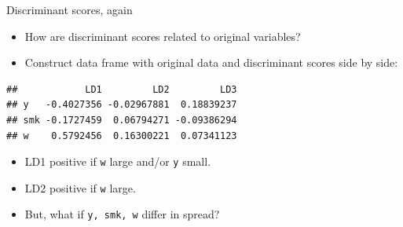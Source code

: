 \documentclass[ignorenonframetext,]{beamer}
\newenvironment{Shaded}{\begin{snugshade}}{\end{snugshade}}
\newcommand{\DecValTok}[1]{\textcolor[rgb]{0.00,0.00,0.81}{#1}}
\newcommand{\FloatTok}[1]{\textcolor[rgb]{0.00,0.00,0.81}{#1}}
\newcommand{\KeywordTok}[1]{\textcolor[rgb]{0.13,0.29,0.53}{\textbf{#1}}}
\newcommand{\NormalTok}[1]{#1}
\newcommand{\OperatorTok}[1]{\textcolor[rgb]{0.81,0.36,0.00}{\textbf{#1}}}
\newcommand{\StringTok}[1]{\textcolor[rgb]{0.31,0.60,0.02}{#1}}
\begin{document}
\begin{frame}[fragile]{Discriminant scores, again}
\protect\hypertarget{discriminant-scores-again}{}

\begin{itemize}
\item
  How are discriminant scores related to original variables?
\item
  Construct data frame with original data and discriminant scores side
  by side:
\end{itemize}

\begin{Shaded}
\end{Shaded}

\begin{verbatim}
##            LD1         LD2         LD3
## y   -0.4027356 -0.02967881  0.18839237
## smk -0.1727459  0.06794271 -0.09386294
## w    0.5792456  0.16300221  0.07341123
\end{verbatim}

\begin{Shaded}
\end{Shaded}

\begin{itemize}
\item
  LD1 positive if \texttt{w} large and/or \texttt{y} small.
\item
  LD2 positive if \texttt{w} large.
\item
  But, what if \texttt{y,\ smk,\ w} differ in spread?
\end{itemize}

\end{frame}
\end{document}
